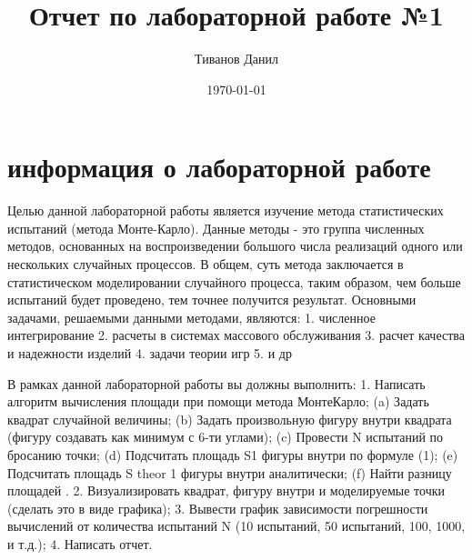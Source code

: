 \documentclass[a4paper,12pt]{article}
\author{Тиванов Данил}
\title{Отчет по лабораторной работе №1}
\date{\today}
\begin{document}
\maketitle 
\section{информация о лабораторной работе}	
Целью данной лабораторной работы является изучение метода статистических испытаний (метода Монте-Карло). Данные методы - это группа численных методов, основанных на воспроизведении большого числа реализаций одного или нескольких случайных процессов. В общем, суть метода
заключается в статистическом моделировании случайного процесса, таким
образом, чем больше испытаний будет проведено, тем точнее получится результат. Основными задачами, решаемыми данными методами, являются:
1. численное интегрирование
2. расчеты в системах массового обслуживания
3. расчет качества и надежности изделий
4. задачи теории игр
5. и др

В рамках данной лабораторной работы вы должны выполнить:
1. Написать алгоритм вычисления площади при помощи метода МонтеКарло;
(a) Задать квадрат случайной величины;
(b) Задать произвольную фигуру внутри квадрата (фигуру создавать как минимум с 6-ти углами);
(c) Провести N испытаний по бросанию точки;
(d) Подсчитать площадь S1 фигуры внутри по формуле (1);
(e) Подсчитать площадь S
theor
1 фигуры внутри аналитически;
(f) Найти разницу площадей .
2. Визуализировать квадрат, фигуру внутри и моделируемые точки (сделать это в виде графика);
3. Вывести график зависимости погрешности вычислений от количества испытаний N (10 испытаний, 50 испытаний, 100, 1000, и т.д.);
4. Написать отчет.
\end{document}
